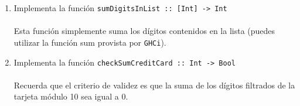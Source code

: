 \begin{exercise}
\begin{enumerate}
           \item  Implementa la función \texttt{sumDigitsInList :: [Int] ->\ Int} \\\\
                  Esta función simplemente suma los dígitos contenidos en la lista (puedes utilizar la función sum provista por \texttt{GHCi}).\\
           \item  Implementa la función \texttt{checkSumCreditCard :: Int ->\ Bool}\\\\
                  Recuerda que el criterio de validez es que la suma de los dígitos filtrados de la tarjeta módulo 10 sea igual a 0.
                    
        \end{enumerate}    
    \end{exercise}

    \bigskip

